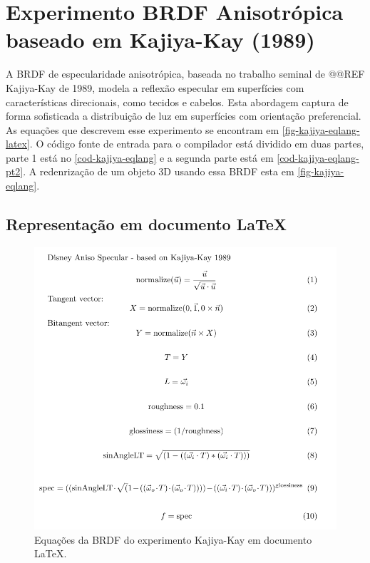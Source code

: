 \section{Experimento BRDF Anisotrópica baseado em Kajiya-Kay (1989)}

A BRDF de especularidade anisotrópica, baseada no trabalho seminal de @@REF Kajiya-Kay de 1989, modela a reflexão especular em superfícies com características direcionais, como tecidos e cabelos. Esta abordagem captura de forma sofisticada a distribuição de luz em superfícies com orientação preferencial. As equações que descrevem esse experimento se encontram em \autoref{fig-kajiya-eqlang-latex}. O código fonte de entrada para o compilador está dividido em duas partes, parte 1 está no \autoref{cod-kajiya-eqlang} e a segunda parte está em \autoref{cod-kajiya-eqlang-pt2}. A redenrização de um objeto 3D usando essa BRDF esta em \autoref{fig-kajiya-eqlang}.

\subsection{Representação em documento \LaTeX{}}
\begin{figure}[H]
    \caption{\label{fig-kajiya-eqlang-latex} \small Equações da BRDF do experimento Kajiya-Kay em documento \LaTeX{}.}
    \begin{center}
        \includegraphics[scale=0.92]{./Imagens/brdfs/aniso.pdf}
    \end{center}
\end{figure}

